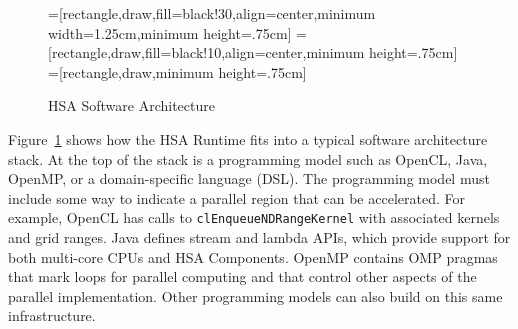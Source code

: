 \documentclass[final]{book}
\begin{document}
\begin{figure}
  \centering
  =[rectangle,draw,fill=black!30,align=center,minimum width=1.25cm,minimum height=.75cm]
  =[rectangle,draw,fill=black!10,align=center,minimum height=.75cm]
  =[rectangle,draw,minimum height=.75cm]
  \caption{HSA Software Architecture}
  \label{fig:swarch}
\end{figure}

Figure~\ref{fig:swarch} shows how the HSA Runtime fits into a typical software
architecture stack. At the top of the stack is a programming model such as
OpenCL\texttrademark, Java, OpenMP, or a domain-specific language (DSL). The
programming model must include some way to indicate a parallel region that can
be accelerated. For example, OpenCL has calls to \texttt{clEnqueueNDRangeKernel}
with associated kernels and grid ranges. Java defines stream and lambda APIs,
which provide support for both multi-core CPUs and HSA Components. OpenMP
contains OMP pragmas that mark loops for parallel computing and that control
other aspects of the parallel implementation. Other programming models can also
build on this same infrastructure.
\end{document}
